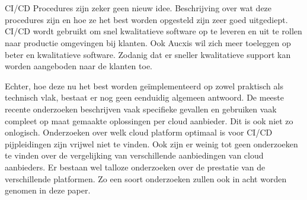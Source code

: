 

\section{}
\label{sec:probleemstelling}
CI/CD Procedures zijn zeker geen nieuw idee. Beschrijving over wat deze procedures zijn en hoe ze het best worden opgesteld zijn zeer goed uitgediept. CI/CD wordt gebruikt om snel kwalitatieve software op te leveren en uit te rollen naar productie omgevingen bij klanten. Ook Aucxis wil zich meer toeleggen op beter en kwalitatieve software. Zodanig dat er sneller kwalitatieve support kan worden aangeboden naar de klanten toe. 

Echter, hoe deze nu het best worden geïmplementeerd op zowel praktisch als technisch vlak, bestaat er nog geen eenduidig algemeen antwoord. De meeste recente onderzoeken beschrijven vaak specifieke gevallen en gebruiken vaak compleet op maat gemaakte oplossingen per cloud aanbieder. Dit is ook niet zo onlogisch. Onderzoeken over welk cloud platform optimaal is voor CI/CD pijpleidingen zijn vrijwel niet te vinden. Ook zijn er weinig tot geen onderzoeken te vinden over de vergelijking van verschillende aanbiedingen van cloud aanbieders. Er bestaan wel talloze onderzoeken over de prestatie van de verschillende platformen. Zo een soort onderzoeken zullen ook in acht worden genomen in deze paper.

